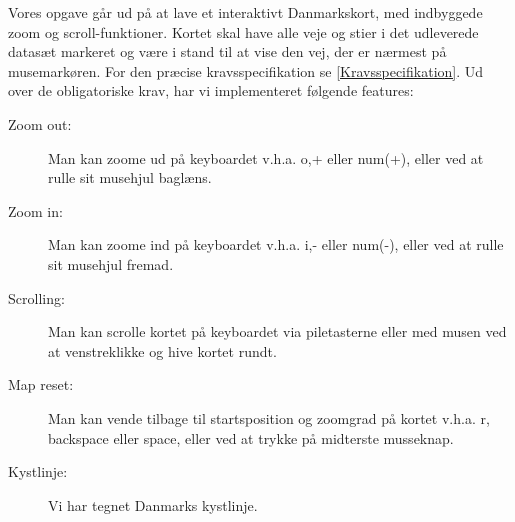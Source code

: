 Vores opgave går ud på at lave et interaktivt Danmarkskort, med indbyggede zoom og scroll-funktioner. Kortet skal have alle veje og stier i det udleverede datasæt markeret og være i stand til at vise den vej, der er nærmest på musemarkøren. For den præcise kravsspecifikation se \ref{Kravsspecifikation}.
\newline \newline
Ud over de obligatoriske krav, har vi implementeret følgende features:
\begin{description}
	\item[Zoom out:] Man kan zoome ud på keyboardet v.h.a. o,+ eller num(+), eller ved at rulle sit musehjul baglæns.
	\item[Zoom in:] Man kan zoome ind på keyboardet v.h.a. i,- eller num(-), eller ved at rulle sit musehjul fremad.
	\item[Scrolling:] Man kan scrolle kortet på keyboardet via piletasterne eller med musen ved at venstreklikke og hive kortet rundt.
	\item[Map reset:] Man kan vende tilbage til startsposition og zoomgrad på kortet v.h.a. r, backspace eller space, eller ved at trykke på midterste musseknap.
	\item[Kystlinje:] Vi har tegnet Danmarks kystlinje.
\end{description}